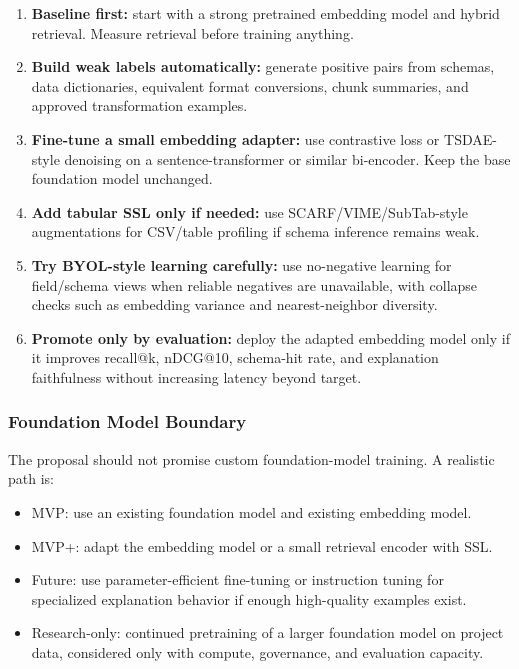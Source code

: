 \begin{enumerate}
  \item \textbf{Baseline first:} start with a strong pretrained embedding model and hybrid retrieval. Measure retrieval before training anything.
  \item \textbf{Build weak labels automatically:} generate positive pairs from schemas, data dictionaries, equivalent format conversions, chunk summaries, and approved transformation examples.
  \item \textbf{Fine-tune a small embedding adapter:} use contrastive loss or TSDAE-style denoising on a sentence-transformer or similar bi-encoder. Keep the base foundation model unchanged.
  \item \textbf{Add tabular SSL only if needed:} use SCARF/VIME/SubTab-style augmentations for CSV/table profiling if schema inference remains weak.
  \item \textbf{Try BYOL-style learning carefully:} use no-negative learning for field/schema views when reliable negatives are unavailable, with collapse checks such as embedding variance and nearest-neighbor diversity.
  \item \textbf{Promote only by evaluation:} deploy the adapted embedding model only if it improves recall@k, nDCG@10, schema-hit rate, and explanation faithfulness without increasing latency beyond target.
\end{enumerate}

\subsubsection{Foundation Model Boundary}

The proposal should not promise custom foundation-model training. A realistic path is:

\begin{itemize}
  \item MVP: use an existing foundation model and existing embedding model.
  \item MVP+: adapt the embedding model or a small retrieval encoder with SSL.
  \item Future: use parameter-efficient fine-tuning or instruction tuning for specialized explanation behavior if enough high-quality examples exist.
  \item Research-only: continued pretraining of a larger foundation model on project data, considered only with compute, governance, and evaluation capacity.
\end{itemize}

